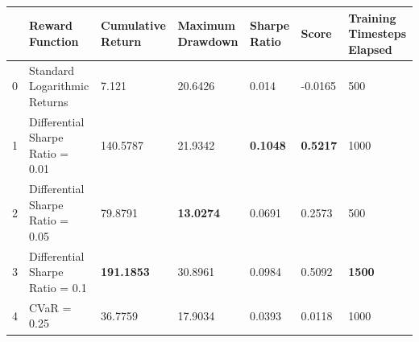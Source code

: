 \begin{tabular}{lllllll}
\toprule
 & Reward Function & Cumulative Return & Maximum Drawdown & Sharpe Ratio & Score & Training Timesteps Elapsed \\
\midrule
0 & Standard Logarithmic Returns & 7.121 & 20.6426 & 0.014 & -0.0165 & 500 \\
1 & Differential Sharpe Ratio = 0.01 & 140.5787 & 21.9342 & \textbf{0.1048} & \textbf{0.5217} & 1000 \\
2 & Differential Sharpe Ratio = 0.05 & 79.8791 & \textbf{13.0274} & 0.0691 & 0.2573 & 500 \\
3 & Differential Sharpe Ratio = 0.1 & \textbf{191.1853} & 30.8961 & 0.0984 & 0.5092 & \textbf{1500} \\
4 & CVaR = 0.25 & 36.7759 & 17.9034 & 0.0393 & 0.0118 & 1000 \\
\bottomrule
\end{tabular}

